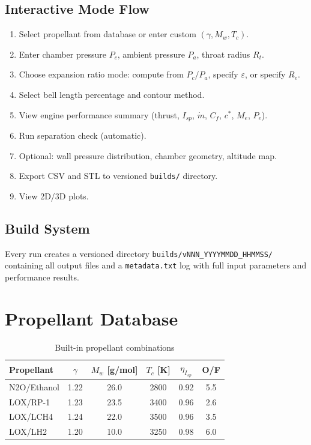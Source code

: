 \documentclass[11pt,a4paper]{article}
\begin{document}
\subsection{Interactive Mode Flow}

\begin{enumerate}[nosep]
\item Select propellant from database or enter custom $(\gamma, M_w, T_c)$.
\item Enter chamber pressure $P_c$, ambient pressure $P_a$, throat radius $R_t$.
\item Choose expansion ratio mode: compute from $P_c/P_a$, specify $\varepsilon$, or specify $R_e$.
\item Select bell length percentage and contour method.
\item View engine performance summary (thrust, $I_{sp}$, $\dot{m}$, $C_f$, $c^*$, $M_e$, $P_e$).
\item Run separation check (automatic).
\item Optional: wall pressure distribution, chamber geometry, altitude map.
\item Export CSV and STL to versioned \texttt{builds/} directory.
\item View 2D/3D plots.
\end{enumerate}

\subsection{Build System}

Every run creates a versioned directory \texttt{builds/vNNN\_YYYYMMDD\_HHMMSS/} containing all output files and a \texttt{metadata.txt} log with full input parameters and performance results.

\section{Propellant Database}

\begin{table}[H]
\centering
\caption{Built-in propellant combinations}
\begin{tabular}{@{}lccccc@{}}
\toprule
\textbf{Propellant} & $\gamma$ & $M_w$ [g/mol] & $T_c$ [K] & $\eta_{I_{sp}}$ & O/F \\
\midrule
N2O/Ethanol & 1.22 & 26.0 & 2800 & 0.92 & 5.5 \\
LOX/RP-1 & 1.23 & 23.5 & 3400 & 0.96 & 2.6 \\
LOX/LCH4 & 1.24 & 22.0 & 3500 & 0.96 & 3.5 \\
LOX/LH2 & 1.20 & 10.0 & 3250 & 0.98 & 6.0 \\
\bottomrule
\end{tabular}
\end{table}
\end{document}
